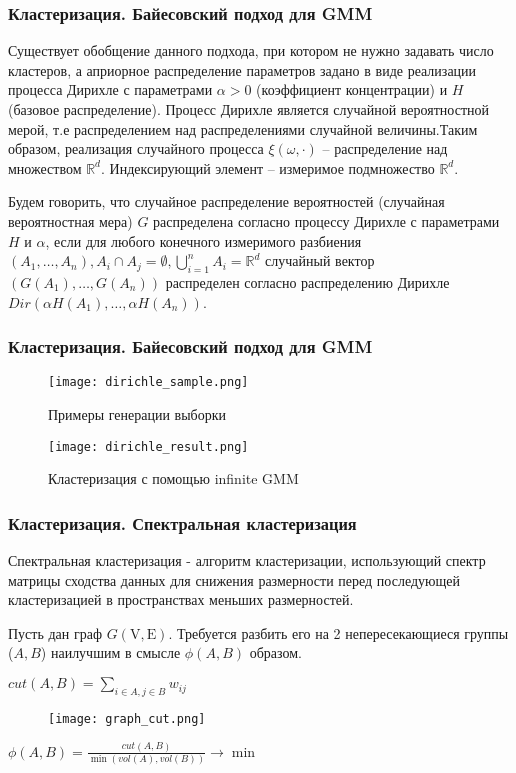 \documentclass[notheorems, handout]{beamer}
\begin{document}
	\begin{frame}
	\frametitle{Кластеризация. Байесовский подход для GMM}
	Существует обобщение данного подхода, при котором не нужно задавать число кластеров, а априорное распределение параметров задано в виде реализации процесса Дирихле с параметрами $\alpha > 0$ (коэффициент концентрации) и $H$ (базовое распределение). Процесс Дирихле является случайной вероятностной мерой, т.е распределением над распределениями случайной величины.Таким образом, реализация случайного процесса $\xi(\omega, \cdot)$ -- распределение над множеством $\mathbb{R}^d$. Индексирующий элемент -- измеримое подмножество $\mathbb{R}^d$.
	
	Будем говорить, что случайное распределение вероятностей (случайная вероятностная мера) $G$ распределена согласно
	процессу Дирихле с параметрами $H$ и $\alpha$, если для любого конечного измеримого разбиения $(A_1,\ldots, A_n), A_i \cap A_j=\emptyset, \bigcup\limits_{i=1}^{n} A_i=\mathbb{R}^d$
	случайный вектор $(G(A_1),\ldots, G(A_n))$ распределен согласно распределению Дирихле $Dir(\alpha H(A_1),\ldots, \alpha H(A_n))$.	
	\end{frame}
	
	\begin{frame}
	\frametitle{Кластеризация. Байесовский подход для GMM}
	\begin{figure}[H]
	\begin{center}
		\texttt{[image: dirichle\_sample.png]}
		\caption{Примеры генерации выборки}
	\end{center}
	\end{figure}
	\begin{figure}[H]
	\begin{center}
		\texttt{[image: dirichle\_result.png]}
		\caption{Кластеризация с помощью infinite GMM}
	\end{center}
	\end{figure}
	\end{frame}	
	
	\begin{frame}
	\frametitle{Кластеризация. Спектральная кластеризация}
	Спектральная кластеризация - алгоритм кластеризации, использующий спектр матрицы сходства данных для снижения размерности перед последующей кластеризацией в пространствах меньших размерностей.
	
	Пусть дан граф $G(\mathrm{V}, \mathrm{E})$. Требуется разбить его на 2 непересекающиеся группы ($A, B$) наилучшим в смысле $\phi(A,B)$ образом.
	\vspace{12pt}
	
	$cut(A,B)=\sum\limits_{i \in A, j \in B}w_{ij}$
	\begin{figure}[H]
		\begin{center}
			\texttt{[image: graph\_cut.png]}
		\end{center}
	\end{figure}
	
	$\phi(A,B)=\frac{cut(A,B)}{\min(vol(A), vol(B))} \rightarrow \min$
	\end{frame}	
	
\end{document}
